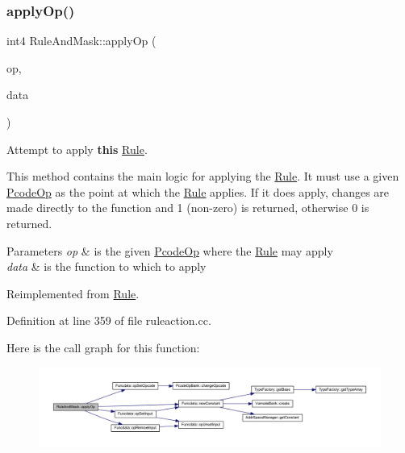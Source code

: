 \subsubsection{\texorpdfstring{applyOp()}{applyOp()}}
{\footnotesize\ttfamily int4 Rule\+And\+Mask\+::apply\+Op (\begin{DoxyParamCaption}\item[{\mbox{\hyperlink{class_pcode_op}{Pcode\+Op}} $\ast$}]{op,  }\item[{\mbox{\hyperlink{class_funcdata}{Funcdata}} \&}]{data }\end{DoxyParamCaption})\hspace{0.3cm}{\ttfamily [virtual]}}



Attempt to apply {\bfseries{this}} \mbox{\hyperlink{class_rule}{Rule}}. 

This method contains the main logic for applying the \mbox{\hyperlink{class_rule}{Rule}}. It must use a given \mbox{\hyperlink{class_pcode_op}{Pcode\+Op}} as the point at which the \mbox{\hyperlink{class_rule}{Rule}} applies. If it does apply, changes are made directly to the function and 1 (non-\/zero) is returned, otherwise 0 is returned. 
\begin{DoxyParams}{Parameters}
{\em op} & is the given \mbox{\hyperlink{class_pcode_op}{Pcode\+Op}} where the \mbox{\hyperlink{class_rule}{Rule}} may apply \\
\hline
{\em data} & is the function to which to apply \\
\hline
\end{DoxyParams}


Reimplemented from \mbox{\hyperlink{class_rule_a4e3e61f066670175009f60fb9dc60848}{Rule}}.



Definition at line 359 of file ruleaction.\+cc.

Here is the call graph for this function\+:
\nopagebreak
\begin{figure}[H]
\begin{center}
\leavevmode
\includegraphics[width=350pt]{class_rule_and_mask_a366c5419fa1fb118d35b7f9794d72e47_cgraph}
\end{center}
\end{figure}
\mbox{\label{class_rule_and_mask_a0d8910f37dde4f7ee748e529f174f332}} 
